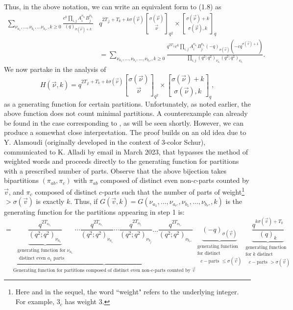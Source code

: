 \documentclass[12pt,a4paper]{amsart}
\theoremstyle{definition}
\theoremstyle{notation}
\theoremstyle{corollary}
\begin{document}
Thus, in the above notation, we can write an equivalent form to (1.8) as
\begin{align*}
 \sum_{\nu_{a_1},\dots,\nu_{b_1},\dots\nu_{b_{r''}},k\geq0}\frac{c^k\prod_{i,j} A_i^{\nu_{a_i}}B_j^{\nu_{b_i}}}{(q)_{\sigma(\vec{\nu})+k}} &q^{2T_{\vec{\nu}}+T_k+k\sigma(\vec{\nu})}{\sigma(\vec{\nu})\brack \vec{\nu}}_{q^2}\times {\sigma(\vec{\nu})+k\brack \sigma(\vec{\nu}),k}_{q} \\
 &=\sum_{\nu_{a_1},\dots,\nu_{b_1},\dots,\nu_{b_{r''}},k\geq0}\frac{q^{2T_{\vec{v}}}c^k\prod_{i,j} A_i^{\nu_{a_i}}B_j^{\nu_{b_i}} (-q)_{\sigma(\vec{v})}(-cq^{\sigma(\vec{v})+1})}{\prod_{i,j} (q^2;q^2)_{\nu_{a_i}}(q^2;q^2)_{\nu_{b_i}}}.
\end{align*}
We now partake in the analysis of \[H(\vec{\nu},k)= q^{2T_{\vec{\nu}}+T_k+k\sigma(\vec{\nu})}{\sigma(\vec{\nu})\brack \vec{\nu}}_{q^2}\times {\sigma(\vec{\nu})+k\brack \sigma(\vec{\nu}),k}_{q},\]
as a generating function for certain partitions. Unfortunately, as noted earlier, the above function does not count minimal partitions. A counterexample can already be found in the case corresponding to \cite[Thm.~C5]{YAKA25}, as will be seen shortly. However, we can produce a somewhat close interpretation.  
The proof builds on an old idea due to Y. Alamoudi (originally developed in the context of 3-color Schur), communicated to K.  Alladi by email in March 2023, that bypasses the method of weighted words and proceeds directly to the generating function for partitions with a prescribed number of parts. Observe that the above bijection takes bipartitions $(\pi_{ab},\pi_c)$ with $\pi_{ab}$ composed of distinct even non-$c$-parts counted by $\vec{v}$, and $\pi_c$ composed of distinct $c$-parts such that the number of parts of weight\footnote{Here and in the sequel, the word ``weight" refers to the underlying integer. For example, $3_c$ has weight $3$.} $>\sigma(\vec{v})$ is exactly $k$. Thus, if $G(\vec{v},k)=G(\nu_{a_1},\dots,\nu_{a_{r'}},\nu_{b_1},\dots,\nu_{b_{r''}},k)$ is the generating function for the partitions appearing in step 1 is: 
\[=\underbrace{\underbrace{\frac{q^{2T_{\nu_{a_1}}}}{ (q^2;q^2)_{\nu_{a_1}}}}_{\substack{\text{generating function for $\nu_{a_1}$}\\ \text{ distinct even $a_1$ parts} }}\cdots\frac{q^{2T_{\nu_{a_i}}}}{ (q^2;q^2)_{\nu_{a_i}}}\cdots
\frac{q^{2T_{\nu_{b_j}}}}{ (q^2;q^2)_{\nu_{b_j}}}\dots\frac{q^{2T_{\nu_{b_{r''}}}}}{ (q^2;q^2)_{\nu_{b_{r''}}}}
}_\text{Generating function for partitions composed of distinct even non-$c$-parts counted by $\vec{v}$}\underbrace{(-q)_{\sigma(\vec{v})}}_{\substack{{\text{generating function}}\\ \text{for distinct}\\ \text{ $c-$parts $\leq\sigma(\vec{v})$}}}\underbrace{\frac{q^{k\sigma(\vec{v})+T_k}}{(q)_k}}_{\substack{{\text{generating function}}\\ \text{for $k$ distinct}\\ \text{ $c-$parts $>\sigma(\vec{v})$}}}\]
\end{document}
